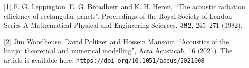   \sectionreferences{}[1] F. G. Leppington, E. G. Broadbent and K. H. Heron, 
  “The acoustic radiation efficiency of rectangular panels”. Proceedings of the 
  Royal Society of London Series A-Mathematical Physical and Engineering 
  Sciences, \textbf{382}, 245–271 (1982). 

  [2] Jim Woodhouse, David Politzer and Hossein Mansour. ``Acoustics of the 
  banjo: theoretical and numerical modelling'', Acta Acustica\textbf{5}, 16 
  (2021). The article is available here: \tt{}\rm{}\tt{}https://doi.org/10.1051/aacus/2021008\rm{} 